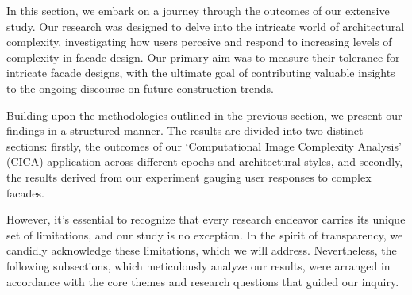 %



In this section, we embark on a journey through the outcomes of our extensive study.
Our research was designed to delve into the intricate world of architectural complexity, investigating how users perceive and respond to increasing levels of complexity in facade design.
Our primary aim was to measure their tolerance for intricate facade designs, with the ultimate goal of contributing valuable insights to the ongoing discourse on future construction trends.

Building upon the methodologies outlined in the previous section, we present our findings in a structured manner.
The results are divided into two distinct sections: firstly, the outcomes of our `Computational Image Complexity Analysis' (CICA) application across different epochs and architectural styles, and secondly, the results derived from our experiment gauging user responses to complex facades.

However, it's essential to recognize that every research endeavor carries its unique set of limitations, and our study is no exception.
In the spirit of transparency, we candidly acknowledge these limitations, which we will address.
Nevertheless, the following subsections, which meticulously analyze our results, were arranged in accordance with the core themes and research questions that guided our inquiry.




